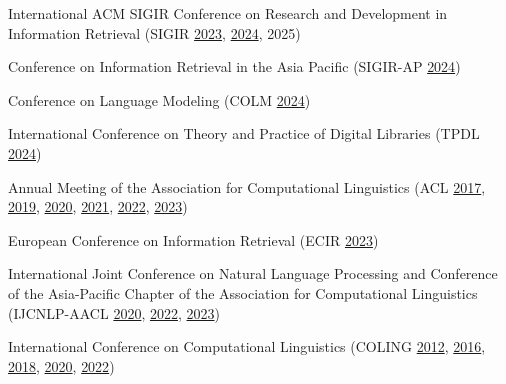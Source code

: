 \begin{itemize*}[label={},
                 itemjoin={{,\space}},
                 afterlabel={},
                 after={{.}}]

    \item International ACM SIGIR Conference on Research and Development in Information Retrieval
    (SIGIR
    \href{https://dl.acm.org/action/showFmPdf?doi=10.1145%2F3539618}{2023},
    \href{https://dl.acm.org/action/showFmPdf?doi=10.1145%2F3626772}{2024},
    2025)

    \item Conference on Information Retrieval in the Asia Pacific
    (SIGIR-AP
    \href{https://dl.acm.org/action/showFmPdf?doi=10.1145%2F3673791}{2024})

    \item Conference on Language Modeling
    (COLM
    \href{https://2024.colmweb.org/}{2024})

    \item International Conference on Theory and Practice of Digital Libraries
    (TPDL
    \href{https://link.springer.com/book/10.1007/978-3-031-72437-4}{2024})

    \item Annual Meeting of the Association for Computational Linguistics
    (ACL
    \href{https://aclanthology.org/P17-1000.pdf}{2017},
    \href{https://aclanthology.org/P19-1000.pdf}{2019},
    \href{https://aclanthology.org/2020.acl-main.0.pdf}{2020},
    \href{https://aclanthology.org/2021.acl-long.0.pdf}{2021},
    \href{https://aclanthology.org/2022.acl-long.0.pdf}{2022},
    \href{https://aclanthology.org/2023.acl-long.0.pdf}{2023})

    \item European Conference on Information Retrieval
    (ECIR \href{https://link.springer.com/content/pdf/bfm:978-3-031-28244-7/1}{2023})

    \item 
    International Joint Conference on Natural Language Processing and Conference of the Asia-Pacific Chapter of the Association for Computational Linguistics (IJCNLP-AACL
    \href{https://aclanthology.org/2020.aacl-main.pdf}{2020},
    \href{https://aclanthology.org/2022.aacl-main.0.pdf}{2022},
    \href{https://aclanthology.org/2023.ijcnlp-main.0.pdf}{2023})

    \item International Conference on Computational Linguistics
    (COLING
    \href{https://aclanthology.org/C12-1000.pdf}{2012},
    \href{https://aclanthology.org/C16-1000.pdf}{2016},
    \href{https://aclanthology.org/C18-1000.pdf}{2018},
    \href{https://aclanthology.org/2020.coling-main.0.pdf}{2020},
    \href{https://aclanthology.org/2022.coling-1.0.pdf}{2022})


\end{itemize*}

